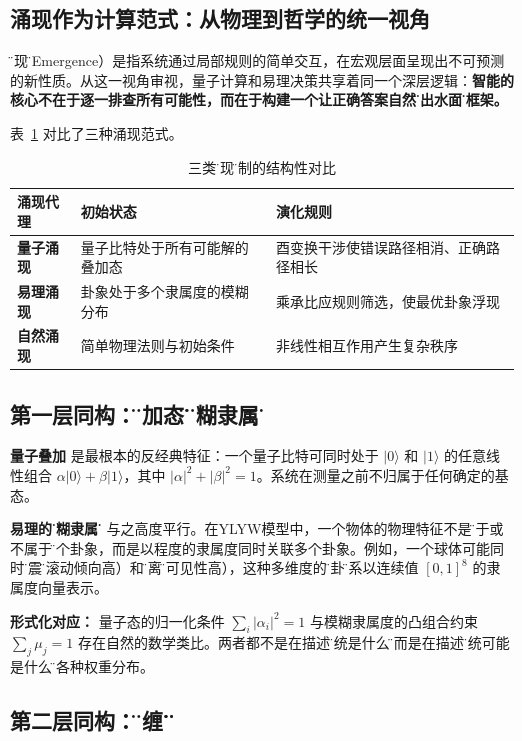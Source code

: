 \documentclass[twocolumn]{article}
\begin{document}
\subsection{涌现作为计算范式：从物理到哲学的统一视角}

\"涌现\"（Emergence）是指系统通过局部规则的简单交互，在宏观层面呈现出不可预测的新性质\cite{anderson1972}。从这一视角审视，量子计算和易理决策共享着同一个深层逻辑：\textbf{智能的核心不在于逐一排查所有可能性，而在于构建一个让正确答案自然\"浮出水面\"的框架。}

表~\ref{tab:emergence} 对比了三种涌现范式。

\begin{table}[htbp]
\centering
\caption{三类\"涌现\"机制的结构性对比}
\label{tab:emergence}
\begin{tabular}{p{2.5cm}p{4cm}p{4cm}}
\toprule
\textbf{涌现代理} & \textbf{初始状态} & \textbf{演化规则} \\
\midrule
\textbf{量子涌现} & 量子比特处于所有可能解的叠加态 & 酉变换干涉使错误路径相消、正确路径相长 \\
\textbf{易理涌现} & 卦象处于多个隶属度的模糊分布 & 乘承比应规则筛选，使最优卦象浮现 \\
\textbf{自然涌现} & 简单物理法则与初始条件 & 非线性相互作用产生复杂秩序 \\
\bottomrule
\end{tabular}
\end{table}

\subsection{第一层同构：\"叠加态\"与\"模糊隶属度\"}

\textbf{量子叠加} 是最根本的反经典特征：一个量子比特可同时处于 $|0\rangle$ 和 $|1\rangle$ 的任意线性组合 $\alpha|0\rangle + \beta|1\rangle$，其中 $|\alpha|^2 + |\beta|^2 = 1$。系统在测量之前不归属于任何确定的基态。

\textbf{易理的\"模糊隶属度\"} 与之高度平行。在YLYW模型中，一个物体的物理特征不是\"属于或不属于\"某个卦象，而是以程度的隶属度同时关联多个卦象。例如，一个球体可能同时\"似震\"（滚动倾向高）和\"似离\"（可见性高），这种多维度的\"似卦\"关系以连续值 $[0, 1]^8$ 的隶属度向量表示\cite{ylyw2026}。

\textbf{形式化对应：} 量子态的归一化条件 $\sum_i |\alpha_i|^2 = 1$ 与模糊隶属度的凸组合约束 $\sum_j \mu_j = 1$ 存在自然的数学类比。两者都不是在描述\"系统是什么\"，而是在描述\"系统可能是什么\"的各种权重分布。

\subsection{第二层同构：\"纠缠\"与\"应\"}
\end{document}
